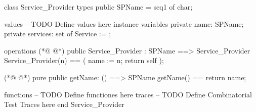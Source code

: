 \begin{vdmpp}[breaklines=true]
class Service_Provider
types
 public SPName = seq1 of char;
 
values
-- TODO Define values here
instance variables
 private name: SPName;
 private services: set of Service := {};
 
operations
(*@
\label{Service:Provider:12}
@*)
 public Service_Provider : SPName ==> Service_Provider
 Service_Provider(n) == (
  name := n;
  return self
 );
 
(*@
\label{getName:18}
@*)
 pure public getName: () ==> SPName
 getName() == return name;
 
 
 
functions
-- TODO Define functiones here
traces
-- TODO Define Combinatorial Test Traces here
end Service_Provider
\end{vdmpp}

